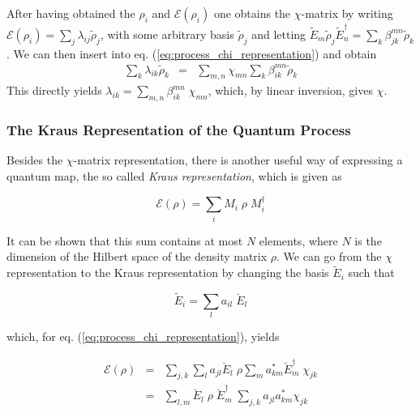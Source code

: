 After having obtained the $\rho_i$ and $\mathcal{E}(\rho_i)$ one obtains the $\chi$-matrix by writing $\mathcal{E}(\rho_i) = \sum_j \lambda_{ij} \tilde{\rho}_j$, with some arbitrary basis $\tilde{\rho}_j$ and
letting $\tilde{E}_m \tilde{\rho}_j \tilde{E}_n^\dagger = \sum_k \beta_{jk}^{mn}\tilde{\rho}_k$. We can then insert into eq. (\ref{eq:process_chi_representation}) and obtain
\begin{eqnarray}
\sum\limits_k \lambda_{ik} \tilde{\rho}_k & = & \sum\limits_{m,n} \chi_{mn} \sum\limits_k \beta_{ik}^{mn} \tilde{\rho}_k  
\end{eqnarray}
This directly yields $\lambda_{ik} = \sum_{m,n}\beta_{ik}^{mn}\; \chi_{mn}$, which, by linear inversion,  gives $\chi$.

\subsubsection{The Kraus Representation of the Quantum Process}

Besides the $\chi$-matrix representation, there is another useful way of expressing a quantum map, the so called {\it Kraus representation}, which is given as

\begin{equation}
 \mathcal{E}(\rho) = \sum\limits_i M_i \; \rho \; M_i^\dagger \label{eq:process_kraus_representation}
\end{equation}

It can be shown \citep{haroche_exploring_2006} that this sum contains at most $N$ elements, where $N$ is the dimension of the Hilbert space of the density matrix $\rho$. We can go from the $\chi$ representation to the Kraus representation by changing the basis $\tilde{E}_i$ such that

\begin{equation}
	\tilde{E}_i = \sum\limits_l a_{il}\; \breve{E}_l
\end{equation}

which, for eq. (\ref{eq:process_chi_representation}), yields

\begin{eqnarray}
 \mathcal{E}(\rho) & = & \sum\limits_{j,k} \sum\limits_l a_{jl} \breve{E}_l \; \rho \sum\limits_m a_{km}^* \breve{E}_m^\dagger \; \chi_{jk} \\
 & = & \sum\limits_{l,m}  \breve{E}_l \; \rho \; \breve{E}_m^\dagger \; \sum\limits_{j,k} a_{jl} a_{km}^* \chi_{jk} \label{eq:process_chi_transformed}
\end{eqnarray}


